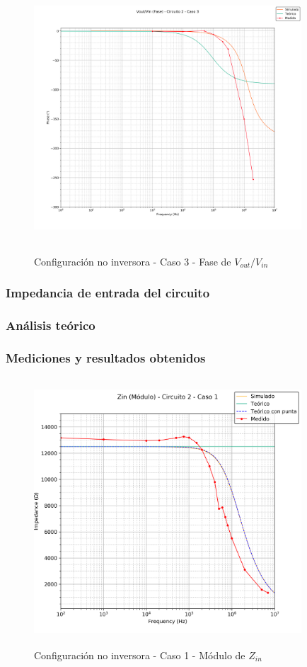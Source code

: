 \begin{figure}[H] %
	\centering
	\includegraphics[width=10cm,height=10cm,keepaspectratio]{../EJ1/00GRAFICOS/c2c3/c2c3voviFASE.png}
	\caption{Configuración no inversora - Caso 3 - Fase de $V_{out}/V_{in}$}
	\label{c2c3voviP}
\end{figure}


\subsubsection{Impedancia de entrada del circuito}%

\subsubsection*{An\'alisis te\'orico} %

\subsubsection*{Mediciones y resultados obtenidos} %
\begin{figure}[H] %
	\centering
	\includegraphics[width=10cm,height=10cm,keepaspectratio]{../EJ1/00GRAFICOS/c2c1/c2c1ZINpunta.png}
	\caption{Configuración no inversora - Caso 1 - M\'odulo de $Z_{in}$}
	\label{c2c1zinM}
\end{figure}

